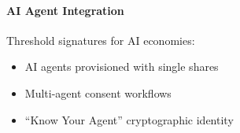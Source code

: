\paragraph{AI Agent Integration} Threshold signatures for AI economies:
\begin{itemize}
\item AI agents provisioned with single shares
\item Multi-agent consent workflows
\item ``Know Your Agent'' cryptographic identity
\end{itemize}

